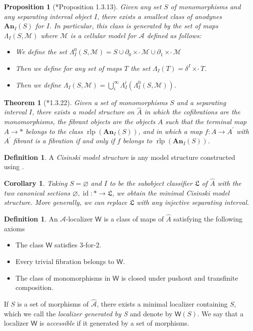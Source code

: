 \documentclass[a4paper]{article}
\numberwithin{equation}{subsection}
\theoremstyle{plain}   %
\newtheorem{thm}[equation]{Theorem}
\newtheorem{prop}[equation]{Proposition}
\newtheorem{cor}[equation]{Corollary}
\theoremstyle{definition}
\newtheorem{defn}[equation]{Definition}
\theoremstyle{remark}
\theoremstyle{plain}
\DeclareMathOperator{\id}{id}
\newcommand{\psh}[1]{\ensuremath{\widehat{#1}}}
\begin{document}
\begin{prop}[\cite{cisinski-book}*{Proposition 1.3.13}] Given any set \(S\) of monomorphisms and any separating interval object \(I\), there exists a smallest class of anodynes \(\mathbf{An}_I(S)\) for \(I\).  In particular, this class is generated by the set of maps \(\Lambda_I(S,\mathscr{M})\) where \(\mathscr{M}\) is a cellular model for \(\mathcal{A}\) defined as follows:
	\begin{itemize}
		\item We define the set \(\Lambda_I^0(S,\mathscr{M})=S \cup \partial_0 \times^\lrcorner \mathscr{M} \cup \partial_1 \times^\lrcorner \mathscr{M}\)
		\item Then we define for any set of maps \(T\) the set \(\Lambda_I(T)=\delta^I\times^\lrcorner T\).
		\item Then we define \(\Lambda_I(S,\mathscr{M})=\bigcup_i^\infty \Lambda_I^i(\Lambda_I^0(S,\mathscr{M}))\).  
	\end{itemize}
\end{prop}
\begin{thm}[\cite{cisinski-book}*{1.3.22}]\label{cisinskimaintheorem}
	Given a set of monomorphisms \(S\) and a separating interval \(I\), there exists a model structure on \(\psh{A}\) in which the cofibrations are the monomorphisms, the fibrant objects are the objects \(A\) such that the terminal map \(A\to \ast\) belongs to the class \(\operatorname{rlp}(\mathbf{An}_I(S))\), and in which a map \(f:A\to A^\prime\) with \(A^\prime\) fibrant is a fibration if and only if \(f\) belongs to \(\operatorname{rlp}(\mathbf{An}_I(S))\).
\end{thm}
\begin{defn}
	A \emph{Cisinski model structure} is any model structure constructed using .
\end{defn}
\begin{cor}
	Taking \(S=\varnothing\) and \(I\) to be the subobject classifier \(\mathfrak{L}\) of \(\psh{A}\) with the two canonical sections \(\varnothing,\id:\ast \to \mathfrak{L}\), we obtain the minimal Cisinski model structure.  More generally, we can replace \(\mathfrak{L}\) with any injective separating interval.  
\end{cor}
\begin{defn}
	An \(\mathcal{A}\)-localizer \(\mathsf{W}\) is a class of maps of \(\psh{A}\) satisfying the following axioms
	\begin{itemize}
		\item The class \(\mathsf{W}\) satisfies \(3\)-for-\(2\).
		\item Every trivial fibration belongs to \(\mathsf{W}\).
		\item The class of monomorphisms in \(\mathsf{W}\) is closed under pushout and transfinite composition.
	\end{itemize}
	If \(S\) is a set of morphisms of \(\psh{\mathcal{A}}\), there exists a minimal localizer containing \(S\), which we call the \emph{localizer generated by S} and denote by \(\mathsf{W}(S)\).  We say that a localizer \(\mathsf{W}\) is \emph{accessible} if it generated by a set of morphisms.
\end{defn}
\end{document}
